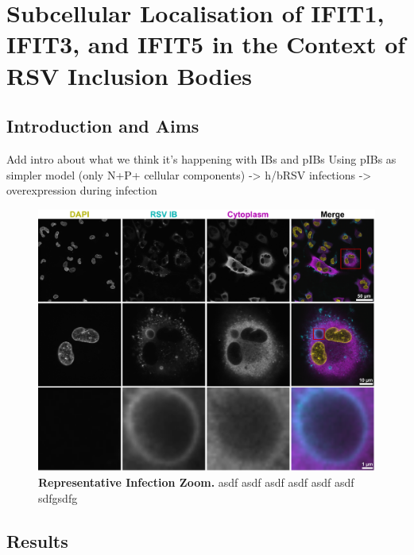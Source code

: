 \chapter{Subcellular Localisation of IFIT1, IFIT3, and IFIT5 in the Context of RSV Inclusion Bodies} \label{ch:Subcellular Localisation of IFIT1, IFIT3, and IFIT5 in the Context of RSV Inclusion Bodies}

\section{Introduction and Aims} \label{sec:Introduction and Aims-Chapter4}
Add intro about what we think it’s happening with IBs and pIBs \newline
Using pIBs as simpler model (only N+P+ cellular components) -> h/bRSV infections -> overexpression during infection

\begin{figure}
    \centering
    \includegraphics[width=1\linewidth]{09. Chapter 4//Figs//01. Introduction/IB-zooms.pdf}
    \caption[Representative Infection Zoom.]{\textbf{Representative Infection Zoom.} asdf asdf asdf asdf asdf asdf sdfgsdfg}
    \label{fig:Representative Infection Zoom}
\end{figure}

\section{Results} \label{sec:Results-Chapter4}





